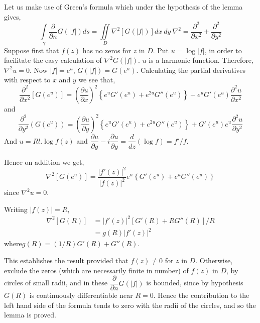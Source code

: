 Let us make use of Green's formula which under the hypothesis of the
lemma gives,
$$
\int\limits_{\gamma}\frac{\partial}{\partial n}
G(|f|)ds=\iint\limits_{D}\nabla^{2}[G(|f|)]dx\ dy\ \nabla^{2}=\dfrac{\partial^{2}}{\partial
  x^{2}}+\frac{\partial^{2}}{\partial y^{2}}
$$
Suppose first that $f(z)$ has no zeros for $z$ in $D$. Put $u=\log
|f|$, in order to facilitate the easy calculation of
$\nabla^{2}G(|f|)$. $u$ is a harmonic function. Therefore,
$\nabla^{2}u=0$. Now $|f|=e^{u}$, $G(|f|)=G(e^{u})$. Calculating the
partial derivatives with respect to $x$ and $y$ we see that,
$$
\frac{\partial^{2}}{\partial x^{2}}[G(e^{u})]=\left(\frac{\partial
  u}{\partial
  x}\right)^{2}\left\{e^{u}G'(e^{u})+e^{2u}G''(e^{u})\right\}+e^{u}G'(e^{u})\frac{\partial^{2}u}{\partial
  x^{2}}
$$
and
$$
\frac{\partial^{2}}{\partial
  y^{2}}\left(G(e^{u})\right)=\left(\frac{\partial u}{\partial
  y}\right)^{2}\left\{e^{u}G'(e^{u})+e^{2u}G''(e^{u})\right\}+G'(e^{u})e^{u}\frac{\partial^{2}u}{\partial
  y^{2}}
$$
And $u=Rl.\log f(z)$ and $\dfrac{\partial u}{\partial
  y}-i\dfrac{\partial u}{\partial y}=\dfrac{d}{dz}(\log f)=f'/f$.

Hence on addition we get,
$$
\nabla^{2}[G(e^{u})]=\frac{|f'(z)|^{2}}{|f(z)|^{2}}e^{u}\left\{G'(e^{u})+e^{u}G''(e^{u})\right\}
$$
since $\nabla^{2}u=0$.

Writing $|f(z)|=R$,
\begin{align*}
\nabla^{2}[G(R)] &= |f'(z)|^{2}[G'(R)+RG''(R)]/R\\
&= g(R)|f'(z)|^{2} 
\end{align*}
where\pageoriginale $g(R)=(1/R)G'(R)+G''(R)$.

This establishes the result provided that $f(z)\neq 0$ for $z$ in
$D$. Otherwise, exclude the zeros (which are necessarily finite in
number) of $f(z)$ in $D$, by circles of small radii, and in these
$\dfrac{\partial}{\partial n}G(|f|)$ is bounded, since by hypothesis
$G(R)$ is continuously differentiable near $R=0$. Hence the
contribution to the left hand side of the formula tends to zero with
the radii of the circles, and so the lemma is proved.

